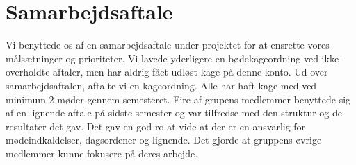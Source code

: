 \section{Samarbejdsaftale}

Vi benyttede os af en samarbejdsaftale under projektet for at ensrette vores målsætninger og prioriteter. Vi lavede yderligere en bødekageordning ved ikke-overholdte aftaler, men har aldrig fået udløst kage på denne konto. Ud over samarbejdsaftalen, aftalte vi en kageordning. Alle har haft kage med ved minimum 2 møder gennem semesteret. 
Fire af grupens medlemmer benyttede sig af en lignende aftale på sidste semester og var tilfredse med den struktur og de resultater det gav. Det gav en god ro at vide at der er en ansvarlig for mødeindkaldelser, dagsordener og lignende. Det gjorde at gruppens øvrige medlemmer kunne fokusere på deres arbejde. 
